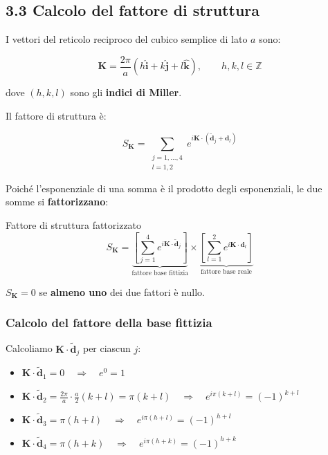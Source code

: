 \subsection*{3.3 Calcolo del fattore di struttura}

I vettori del reticolo reciproco del cubico semplice di lato $a$ sono:

$$\mathbf{K} = \frac{2\pi}{a}(h\hat{\mathbf{i}} + k\hat{\mathbf{j}} + l\hat{\mathbf{k}}), \qquad h, k, l \in \mathbb{Z}$$

dove $(h, k, l)$ sono gli \textbf{indici di Miller}.

Il fattore di struttura è:

$$S_{\mathbf{K}} = \sum_{\substack{j=1,\ldots,4 \\ l=1,2}} e^{i\mathbf{K}\cdot(\tilde{\mathbf{d}}_j + \mathbf{d}_l)}$$

Poiché l'esponenziale di una somma è il prodotto degli esponenziali, le due somme si \textbf{fattorizzano}:

\begin{equazione}{Fattore di struttura fattorizzato}
\begin{equation}
S_{\mathbf{K}} = \underbrace{\left[\sum_{j=1}^{4} e^{i\mathbf{K}\cdot\tilde{\mathbf{d}}_j}\right]}_{\text{fattore base fittizia}} \times \underbrace{\left[\sum_{l=1}^{2} e^{i\mathbf{K}\cdot\mathbf{d}_l}\right]}_{\text{fattore base reale}}
\end{equation}
\end{equazione}

$S_{\mathbf{K}} = 0$ se \textbf{almeno uno} dei due fattori è nullo.

\subsubsection*{Calcolo del fattore della base fittizia}

Calcoliamo $\mathbf{K} \cdot \tilde{\mathbf{d}}_j$ per ciascun $j$:

\begin{itemize}
    \item $\mathbf{K} \cdot \tilde{\mathbf{d}}_1 = 0 \quad\Rightarrow\quad e^{0} = 1$
    \item $\mathbf{K} \cdot \tilde{\mathbf{d}}_2 = \frac{2\pi}{a} \cdot \frac{a}{2}(k + l) = \pi(k + l) \quad\Rightarrow\quad e^{i\pi(k+l)} = (-1)^{k+l}$
    \item $\mathbf{K} \cdot \tilde{\mathbf{d}}_3 = \pi(h + l) \quad\Rightarrow\quad e^{i\pi(h+l)} = (-1)^{h+l}$
    \item $\mathbf{K} \cdot \tilde{\mathbf{d}}_4 = \pi(h + k) \quad\Rightarrow\quad e^{i\pi(h+k)} = (-1)^{h+k}$
\end{itemize}

